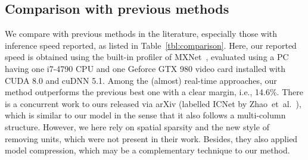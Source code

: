 \documentclass[10pt,twocolumn,letterpaper]{article}
\begin{document}
%
\subsection{Comparison with previous methods}
We compare with previous methods in the literature,
especially those with inference speed reported,
as listed in Table~\ref{tbl:comparison}.
Here, our reported speed is obtained using the built-in profiler of MXNet~\cite{MXNet.2015.Chen},
evaluated using a PC having one i7-4790 CPU and one Geforce GTX 980 video card installed with CUDA 8.0 and cuDNN 5.1.
Among the (almost) real-time approaches,
our method outperforms the previous best one with a clear margin, i.e., 14.6\%.
There is a concurrent work to ours released via arXiv (labelled ICNet by Zhao~et~al.~\cite{ICNet.2017.Zhao}),
which is similar to our model in the sense that it also follows a multi-column structure.
However, we here rely on spatial sparsity and the new style of removing units,
which were not present in their work.
Besides, they also applied model compression, which may be a complementary technique to our method.

\begin{table}
%
\begin{center}
\end{center}
\caption{Comparison with previous best performers on the Cityscapes~\cite{Cityscapes.CVPR.2016.Cordts} \textit{test} set,
especially those with inference speeds reported.
Note that the speeds are only for reference,
since the implementation details vary significantly between different works.
}
\label{tbl:comparison}
\vspace{-3.0mm}
\end{table}
\end{document}
